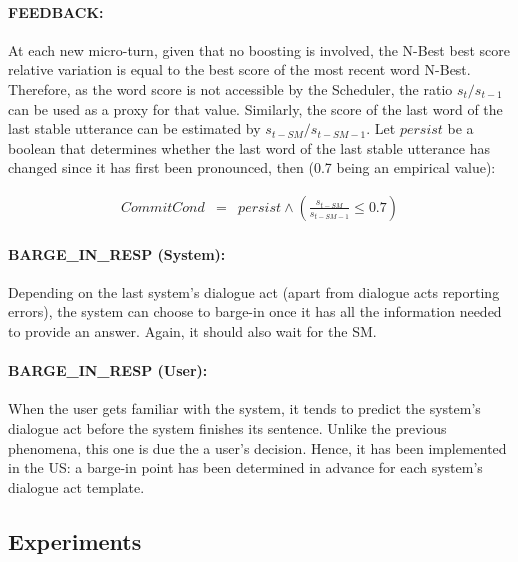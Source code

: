          \paragraph{FEEDBACK:} At each new micro-turn, given that no boosting is involved, the N-Best best score relative variation is equal to the best score of the most recent word N-Best. Therefore, as the word score is not accessible by the Scheduler, the ratio $s_t/s_{t-1}$ can be used as a proxy for that value. Similarly, the score of the last word of the last stable utterance can be estimated by $s_{t-SM}/s_{t-SM-1}$. Let $persist$ be a boolean that determines whether the last word of the last stable utterance has changed since it has first been pronounced, then (0.7 being an empirical value):
				
					\begin{eqnarray}
						CommitCond & = & persist \wedge (\frac{s_{t-SM}}{s_{t-SM-1}} \leq 0.7) \nonumber
					\end{eqnarray}
         
         \paragraph{BARGE\_IN\_RESP (System):} Depending on the last system's dialogue act (apart from dialogue acts reporting errors), the system can choose to barge-in once it has all the information needed to provide an answer. Again, it should also wait for the SM.
         
         \paragraph{BARGE\_IN\_RESP (User):} When the user gets familiar with the system, it tends to predict the system's dialogue act before the system finishes its sentence. Unlike the previous phenomena, this one is due the a user's decision. Hence, it has been implemented in the US: a barge-in point has been determined in advance for each system's dialogue act template.
    
    \subsection{Experiments}
		
